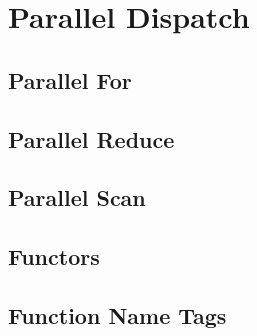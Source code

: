 
\chapter{Parallel Dispatch}
\section{Parallel For}
\section{Parallel Reduce}
\section{Parallel Scan}
\section{Functors}
\section{Function Name Tags}

